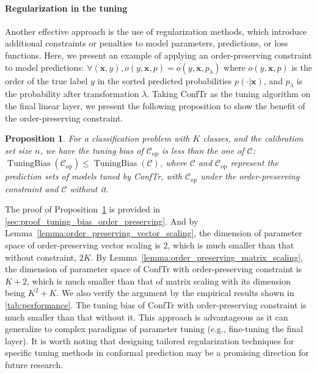 \documentclass{article}
\newcommand{\1}{\mathbbm{1}}
\newcommand{\TuningBias}{\mathop{\text{TuningBias}}}
\theoremstyle{plain}
\newtheorem{proposition}[theorem]{Proposition}
\theoremstyle{definition}
\theoremstyle{remark}
\begin{document}
\paragraph{Regularization in the tuning}
Another effective approach is the use of regularization methods, which introduce additional constraints or penalties to model parameters, predictions, or loss functions. 
Here, we present an example of applying an order-preserving constraint to model predictions: 
\(\forall (\boldsymbol{x}, y), o(y, \boldsymbol{x}, p) = o(y, \boldsymbol{x}, p_\lambda)\) where \(o(y, \boldsymbol{x}, p)\) is the order of the true label \(y\) in the sorted predicted probabilities \(p(\cdot|\boldsymbol{x})\), and \(p_\lambda\) is the probability after transformation \(\lambda\).
Taking ConfTr \citep{stutz2022learning} as the tuning algorithm on the final linear layer, we present the following proposition to show the benefit of the order-preserving constraint. 
\begin{proposition}
    \label{prop:tuning_bias_order_preserving}
    For a classification problem with $K$ classes, and the calibration set size $n$, we have 
    the tuning bias of \({\mathcal{C}}_{\text{op}}\) is less than the one of \({\mathcal{C}}\):
    \(\TuningBias({\mathcal{C}}_{\text{op}}) \leq \TuningBias({\mathcal{C}})\),
    where ${\mathcal{C}}$ and ${\mathcal{C}}_{\text{op}}$ represent the prediction sets of models tuned by ConfTr, with ${\mathcal{C}}_{\text{op}}$ under the order-preserving constraint and ${\mathcal{C}}$ without it.
\end{proposition}
The proof of Proposition~\ref{prop:tuning_bias_order_preserving} is provided in \cref{sec:proof_tuning_bias_order_preserving}. 
And by Lemma~\ref{lemma:order_preserving_vector_scaling}, the dimension of parameter space of order-preserving vector scaling is $2$, which is much smaller than that without constraint, $2K$. 
By Lemma~\ref{lemma:order_preserving_matrix_scaling}, the dimension of parameter space of ConfTr with order-preserving constraint is $K+2$, which is much smaller than that of matrix scaling with its dimension being $K^2+K$. 
We also verify the argument by the empirical results shown in \cref{tab:performance}. 
The tuning bias of ConfTr with order-preserving constraint is much smaller than that without it.
This approach is advantageous as it can generalize to complex paradigms of parameter tuning (e.g., fine-tuning the final layer). 
It is worth noting that designing tailored regularization techniques for specific tuning methods in conformal prediction may be a promising direction for future research.
\end{document}
